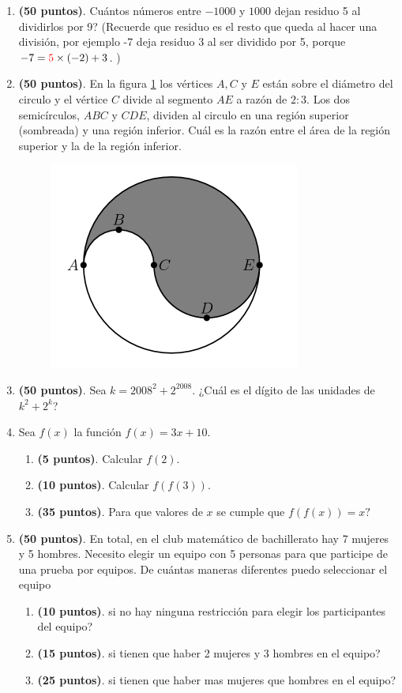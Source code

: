 \begin{enumerate}
	\item \textbf{(50 puntos)}. Cuántos números entre $-1000$ y $1000$ dejan residuo 5 al dividirlos por 9? (Recuerde que residuo es el resto que queda al hacer una división, por ejemplo -7 deja residuo 3 al ser dividido por 5, porque $-7=\color{red}5\color{black} \times (-2) + 3$. )
	

	\item \textbf{(50 puntos)}. En la figura \ref{fig:AV1} los vértices $A,C$ y $E$ están sobre el diámetro del circulo y el vértice $C$ divide al segmento $AE$ a razón de $2:3$. Los dos semicírculos, $ ABC $ y $ CDE $, dividen al circulo en una región superior (sombreada) y una región inferior. Cuál es la razón entre el área de la región superior y la de la región inferior.	
		\begin{figure}[H]
			\centering
			\includegraphics[width=0.5\linewidth]{2020_10_31/imgs/AV1}
			\label{fig:AV1}
		\end{figure}
	
	\item \textbf{(50 puntos)}.  Sea $ k = 2008 ^ 2 + 2 ^ {2008} $. ¿Cuál es el dígito de las unidades de $ k ^ 2 + 2 ^ k $?

	\item Sea $f(x)$ la función $f(x) = 3x+10$.
	\begin{enumerate}
		\item \textbf{(5 puntos)}. Calcular $f(2)$.		
		\item \textbf{(10 puntos)}. Calcular $f(f(3))$.
		\item \textbf{(35 puntos)}. Para que valores de $x$ se cumple que $f(f(x))=x?$
	\end{enumerate} 

	\item \textbf{(50 puntos)}. En total, en el club matemático de bachillerato hay 7 mujeres y 5 hombres. Necesito elegir un equipo con 5 personas para que participe de una prueba por equipos. De cuántas maneras diferentes puedo seleccionar el equipo
		\begin{enumerate}
			\item \textbf{(10 puntos)}. si no hay ninguna restricción para elegir los participantes del equipo? 
			\item \textbf{(15 puntos)}. si tienen que haber 2 mujeres y 3 hombres en el equipo? 
			\item \textbf{(25 puntos)}. si tienen que haber mas mujeres que hombres en el equipo? 
		\end{enumerate} 
	

\end{enumerate}
